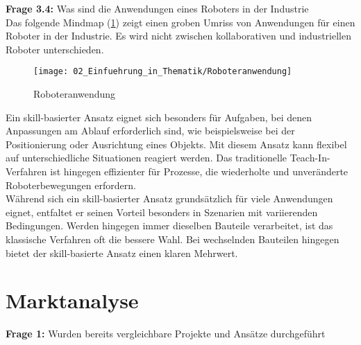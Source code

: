 	\vspace{3mm}
	
	\newpage
	
	\textbf{Frage 3.4:} Was sind die Anwendungen eines Roboters in der Industrie \vspace{2mm} 
	\\
		Das folgende Mindmap (\ref{fig:Roboteranwendung}) zeigt einen groben Umriss von Anwendungen für einen Roboter in der Industrie. Es wird nicht zwischen kollaborativen und industriellen Roboter unterschieden. 
		
		\begin{figure}[h!]
			\centering
			\texttt{[image: 02\_Einfuehrung\_in\_Thematik/Roboteranwendung]}
			\captionsetup{justification=centering}
			\caption{Roboteranwendung}
			\label{fig:Roboteranwendung}
		\end{figure}
		
		Ein skill-basierter Ansatz eignet sich besonders für Aufgaben, bei denen Anpassungen am Ablauf erforderlich sind, wie beispielsweise bei der Positionierung oder Ausrichtung eines Objekts. Mit diesem Ansatz kann flexibel auf unterschiedliche Situationen reagiert werden. Das traditionelle Teach-In-Verfahren ist hingegen effizienter für Prozesse, die wiederholte und unveränderte Roboterbewegungen erfordern.
		\\
		Während sich ein skill-basierter Ansatz grundsätzlich für viele Anwendungen eignet, entfaltet er seinen Vorteil besonders in Szenarien mit variierenden Bedingungen. Werden hingegen immer dieselben Bauteile verarbeitet, ist das klassische Verfahren oft die bessere Wahl. Bei wechselnden Bauteilen hingegen bietet der skill-basierte Ansatz einen klaren Mehrwert.
		
		
	\vspace{3mm}

	\newpage


\section{Marktanalyse} \label{Marktanalyse}

	\textbf{Frage 1:} Wurden bereits vergleichbare Projekte und Ansätze durchgeführt \vspace{2mm} 
	\\
	
